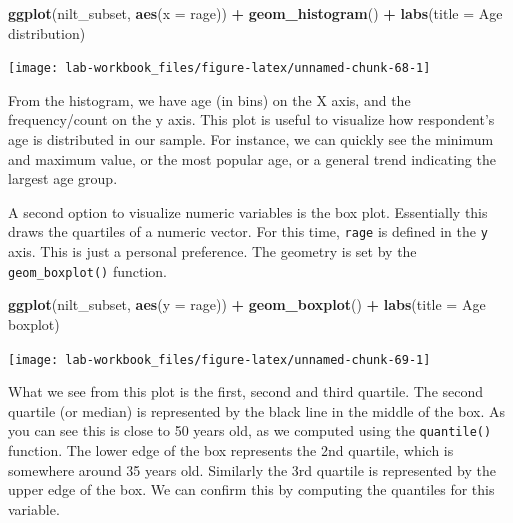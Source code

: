 \documentclass[
]{book}
\newenvironment{Shaded}{\begin{snugshade}}{\end{snugshade}}
\newcommand{\AttributeTok}[1]{\textcolor[rgb]{0.13,0.29,0.53}{#1}}
\newcommand{\FunctionTok}[1]{\textcolor[rgb]{0.13,0.29,0.53}{\textbf{#1}}}
\newcommand{\NormalTok}[1]{#1}
\newcommand{\SpecialCharTok}[1]{\textcolor[rgb]{0.81,0.36,0.00}{\textbf{#1}}}
\newcommand{\StringTok}[1]{\textcolor[rgb]{0.31,0.60,0.02}{#1}}
\begin{document}
\begin{Shaded}
\begin{Highlighting}[]
\FunctionTok{ggplot}\NormalTok{(nilt\_subset, }\FunctionTok{aes}\NormalTok{(}\AttributeTok{x =}\NormalTok{ rage)) }\SpecialCharTok{+}
  \FunctionTok{geom\_histogram}\NormalTok{() }\SpecialCharTok{+}
  \FunctionTok{labs}\NormalTok{(}\AttributeTok{title =} \StringTok{\textquotesingle{}Age distribution\textquotesingle{}}\NormalTok{)}
\end{Highlighting}
\end{Shaded}

\begin{flushleft}\texttt{[image: lab-workbook\_files/figure-latex/unnamed-chunk-68-1]} \end{flushleft}

From the histogram, we have age (in bins) on the X axis, and the frequency/count on the y axis. This plot is useful to visualize how respondent's age is distributed in our sample. For instance, we can quickly see the minimum and maximum value, or the most popular age, or a general trend indicating the largest age group.

A second option to visualize numeric variables is the box plot. Essentially this draws the quartiles of a numeric vector. For this time, \texttt{rage} is defined in the \texttt{y} axis. This is just a personal preference. The geometry is set by the \texttt{geom\_boxplot()} function.

\begin{Shaded}
\begin{Highlighting}[]
\FunctionTok{ggplot}\NormalTok{(nilt\_subset, }\FunctionTok{aes}\NormalTok{(}\AttributeTok{y =}\NormalTok{ rage)) }\SpecialCharTok{+}
  \FunctionTok{geom\_boxplot}\NormalTok{() }\SpecialCharTok{+}
  \FunctionTok{labs}\NormalTok{(}\AttributeTok{title =} \StringTok{\textquotesingle{}Age boxplot\textquotesingle{}}\NormalTok{)}
\end{Highlighting}
\end{Shaded}

\begin{flushleft}\texttt{[image: lab-workbook\_files/figure-latex/unnamed-chunk-69-1]} \end{flushleft}

What we see from this plot is the first, second and third quartile. The second quartile (or median) is represented by the black line in the middle of the box. As you can see this is close to 50 years old, as we computed using the \texttt{quantile()} function. The lower edge of the box represents the 2nd quartile, which is somewhere around 35 years old. Similarly the 3rd quartile is represented by the upper edge of the box. We can confirm this by computing the quantiles for this variable.
\end{document}
